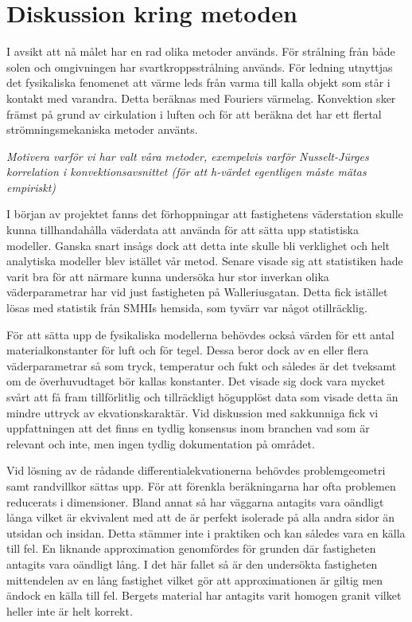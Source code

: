 \section{Diskussion kring metoden}\label{sec:discmethod}

I avsikt att nå målet har en rad olika metoder används. För strålning från både solen och omgivningen har svartkroppsstrålning används. För ledning utnyttjas det fysikaliska fenomenet att värme leds från varma till kalla objekt som står i kontakt med varandra. Detta beräknas med Fouriers värmelag. Konvektion sker främst på grund av cirkulation i luften och för att beräkna det har ett flertal strömningsmekaniska metoder använts.

\emph{\color{red} Motivera varför vi har valt våra metoder, exempelvis varför Nusselt-Jürges korrelation i konvektionsavsnittet (för att h-värdet egentligen måste mätas empiriskt)}

I början av projektet fanns det förhoppningar att fastighetens väderstation skulle kunna tillhandahålla väderdata att använda för att sätta upp statistiska modeller. 
Ganska snart insågs dock att detta inte skulle bli verklighet och helt analytiska modeller blev istället vår metod. Senare visade sig att statistiken hade varit bra för att närmare kunna undersöka hur stor inverkan olika väderparametrar har vid just fastigheten på Walleriusgatan. 
Detta fick istället lösas med statistik från SMHIs hemsida, som tyvärr var något otillräcklig.

För att sätta upp de fysikaliska modellerna behövdes också värden för ett antal materialkonstanter för luft och för tegel. 
Dessa beror dock av en eller flera väderparametrar så som tryck, temperatur och fukt och således är det tveksamt om de överhuvudtaget bör kallas konstanter. 
Det visade sig dock vara mycket svårt att få fram tillförlitlig och tillräckligt högupplöst data som visade detta än mindre uttryck av ekvationskaraktär.
Vid diskussion med sakkunniga fick vi uppfattningen att det finns en tydlig konsensus inom branchen vad som är relevant och inte, men ingen tydlig dokumentation på området.

Vid lösning av de rådande differentialekvationerna behövdes problemgeometri samt randvillkor sättas upp. För
att förenkla beräkningarna har ofta problemen reducerats i dimensioner. Bland annat så har väggarna antagits vara oändligt
långa vilket är ekvivalent med att de är perfekt isolerade på alla andra sidor än utsidan och insidan. Detta stämmer inte
i praktiken och kan således vara en källa till fel. En liknande approximation genomfördes för grunden där fastigheten
antagits vara oändligt lång. I det här fallet så är den undersökta fastigheten mittendelen av en lång fastighet vilket
gör att approximationen är giltig men ändock en källa till fel. Bergets material har antagits varit homogen granit vilket
heller inte är helt korrekt. 


